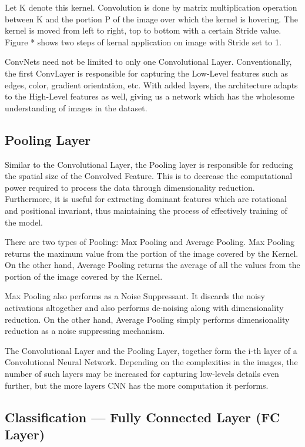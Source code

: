 Let K denote this kernel. Convolution is done by matrix multiplication operation between K and the portion P of the image over which the kernel is hovering. The kernel is moved from left to right, top to bottom with a certain Stride value. Figure * shows two steps of kernal application on image with Stride set to 1. 

ConvNets need not be limited to only one Convolutional Layer. Conventionally, the first ConvLayer is responsible for capturing the Low-Level features such as edges, color, gradient orientation, etc. With added layers, the architecture adapts to the High-Level features as well, giving us a network which has the wholesome understanding of images in the dataset.

\subsection{Pooling Layer}

Similar to the Convolutional Layer, the Pooling layer is responsible for reducing the spatial size of the Convolved Feature. This is to decrease the computational power required to process the data through dimensionality reduction. Furthermore, it is useful for extracting dominant features which are rotational and positional invariant, thus maintaining the process of effectively training of the model.

There are two types of Pooling: Max Pooling and Average Pooling. Max Pooling returns the maximum value from the portion of the image covered by the Kernel. On the other hand, Average Pooling returns the average of all the values from the portion of the image covered by the Kernel.

Max Pooling also performs as a Noise Suppressant. It discards the noisy activations altogether and also performs de-noising along with dimensionality reduction. On the other hand, Average Pooling simply performs dimensionality reduction as a noise suppressing mechanism. 

The Convolutional Layer and the Pooling Layer, together form the i-th layer of a Convolutional Neural Network. Depending on the complexities in the images, the number of such layers may be increased for capturing low-levels details even further, but the more layers CNN has the more computation it performs.

\subsection{Classification — Fully Connected Layer (FC Layer)}

